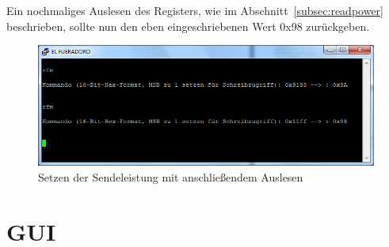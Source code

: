 \documentclass[pdftex, parskip, numbers=noenddot, toc=listof]{scrbook}
\begin{document}
	Ein nochmaliges Auslesen des Registers, wie im Abschnitt~\ref{subsec:readpower} beschrieben, sollte nun den eben eingeschriebenen Wert 0x98 zurückgeben.

	\begin{figure}
		\centering
		\includegraphics[width=.8\textwidth]{Bilder/rfmbefehl2}
		\caption{Setzen der Sendeleistung mit anschließendem Auslesen}
		\label{fig:rfmwrite}
	\end{figure}
	\clearpage

	\section{GUI}
\end{document}
